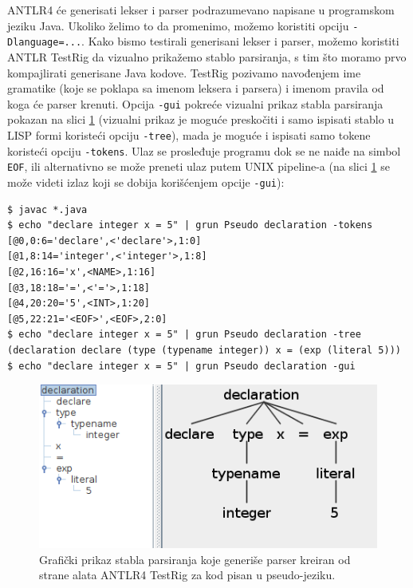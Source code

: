 ANTLR4 će generisati lekser i parser podrazumevano napisane u programskom jeziku Java. Ukoliko želimo to da promenimo, možemo koristiti opciju \texttt{-Dlanguage=...}. Kako bismo testirali generisani lekser i parser, možemo koristiti ANTLR TestRig da vizualno prikažemo stablo parsiranja, s tim što moramo prvo kompajlirati generisane Java kodove. TestRig pozivamo navođenjem ime gramatike (koje se poklapa sa imenom leksera i parsera) i imenom pravila od koga će parser krenuti. Opcija \texttt{-gui} pokreće vizualni prikaz stabla parsiranja pokazan na slici \ref{fig:PseudoTreeGui} (vizualni prikaz je moguće preskočiti i samo ispisati stablo u LISP formi koristeći opciju \texttt{-tree}), mada je moguće i ispisati samo tokene koristeći opciju \texttt{-tokens}. Ulaz se prosleđuje programu dok se ne naiđe na simbol \texttt{EOF}, ili alternativno se može preneti ulaz putem UNIX pipeline-a (na slici \ref{fig:PseudoTreeGui} se može videti izlaz koji se dobija korišćenjem opcije \texttt{-gui}):
\begin{lstlisting}[language={}]
$ javac *.java
$ echo "declare integer x = 5" | grun Pseudo declaration -tokens
[@0,0:6='declare',<'declare'>,1:0]
[@1,8:14='integer',<'integer'>,1:8]
[@2,16:16='x',<NAME>,1:16]
[@3,18:18='=',<'='>,1:18]
[@4,20:20='5',<INT>,1:20]
[@5,22:21='<EOF>',<EOF>,2:0]
$ echo "declare integer x = 5" | grun Pseudo declaration -tree
(declaration declare (type (typename integer)) x = (exp (literal 5)))
$ echo "declare integer x = 5" | grun Pseudo declaration -gui
\end{lstlisting}    

\begin{figure}[h!]
    \centering
        \includegraphics[scale=0.8]{images/pseudo_parse_tree.png}
    \caption{Grafički prikaz stabla parsiranja koje generiše parser kreiran od strane alata ANTLR4 TestRig za kod pisan u pseudo-jeziku.}
    \label{fig:PseudoTreeGui}
\end{figure}


